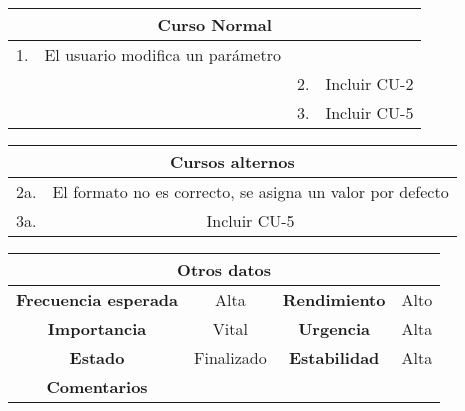 \begin{table}[!h]
\begin{tabular}{|c|c|c|c|}
\hline
\multicolumn{4}{|c|}{Curso Normal} \\
\hline
      1.        &  El usuario modifica un parámetro     &              &              \\
\hline
              &               &       2.       &      Incluir CU-2         \\
\hline
              &               &       3.       &      Incluir CU-5        \\

\hline
\end{tabular}
\end{table}

\begin{table}[!h]
\begin{tabular}{|c|c|}
\hline
\multicolumn{2}{|c|}{\cellcolor{cyan} \textbf{Cursos alternos}} \\
\hline
       2a.       &      El formato no es correcto, se asigna un valor por defecto        \\
\hline
       3a.       &      Incluir CU-5        \\
\hline
\end{tabular}
\end{table}

\begin{table}[!h]
\begin{tabular}{|c|c|c|c|}
\hline
\multicolumn{4}{|c|}{\cellcolor{cyan} \textbf{Otros datos}} \\
\hline
 \cellcolor{cyan} \textbf{Frecuencia esperada}             &     Alta          &    \cellcolor{cyan} \textbf{Rendimiento}          &      Alto        \\
\hline
 \cellcolor{cyan} \textbf{Importancia}             &      Vital         &     \cellcolor{cyan} \textbf{Urgencia}         &      Alta        \\
\hline
 \cellcolor{cyan} \textbf{Estado}             &      Finalizado         &    \cellcolor{cyan} \textbf{Estabilidad}          &     Alta         \\
\hline
 \cellcolor{cyan} \textbf{Comentarios}        &  \multicolumn{3}{|c|}{} \\
\hline
\end{tabular}
\end{table}





\clearpage


